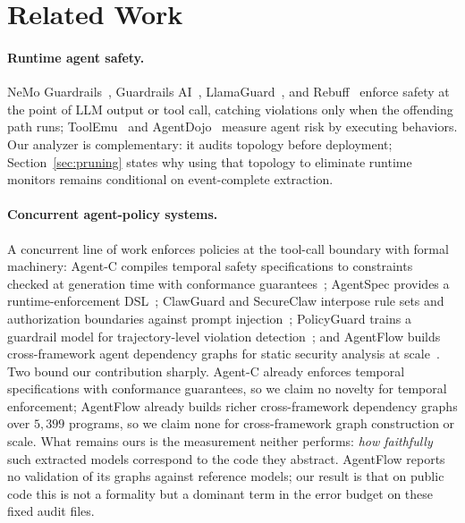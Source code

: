 \section{Related Work}
\label{sec:related}

\paragraph{Runtime agent safety.}
NeMo Guardrails~\citep{nemo_guardrails}, Guardrails AI~\citep{guardrails_ai},
LlamaGuard~\citep{llamaguard}, and Rebuff~\citep{rebuff} enforce safety at the
point of LLM output or tool call, catching violations only when the offending
path runs; ToolEmu~\citep{ruan2024toolemu} and
AgentDojo~\citep{debenedetti2024agentdojo} measure agent risk by executing
behaviors. Our analyzer is complementary: it audits topology before deployment;
Section~\ref{sec:pruning} states why using that topology to eliminate runtime
monitors remains conditional on event-complete extraction.

\paragraph{Concurrent agent-policy systems.}
A concurrent line of work enforces policies at the tool-call boundary with
formal machinery: Agent-C compiles temporal safety specifications to constraints
checked at generation time with conformance guarantees~\citep{kamath2026agentc};
AgentSpec provides a runtime-enforcement DSL~\citep{wang2025agentspec}; ClawGuard
and SecureClaw interpose rule sets and authorization boundaries against prompt
injection~\citep{zhao2026clawguard, ma2026secureclaw}; PolicyGuard trains a
guardrail model for trajectory-level violation
detection~\citep{wen2025policyguard}; and AgentFlow builds cross-framework agent
dependency graphs for static security analysis at
scale~\citep{wang2026agentflow}. Two bound our contribution sharply. Agent-C
already enforces temporal specifications with conformance guarantees, so we claim
no novelty for temporal enforcement; AgentFlow already builds richer
cross-framework dependency graphs over $5{,}399$ programs, so we claim none for
cross-framework graph construction or scale. What remains ours is the measurement
neither performs: \emph{how faithfully} such extracted models correspond to the
code they abstract. AgentFlow reports no validation of its graphs against
reference models; our result is that on public code this is not a formality but
a dominant term in the error budget on these fixed audit files.

